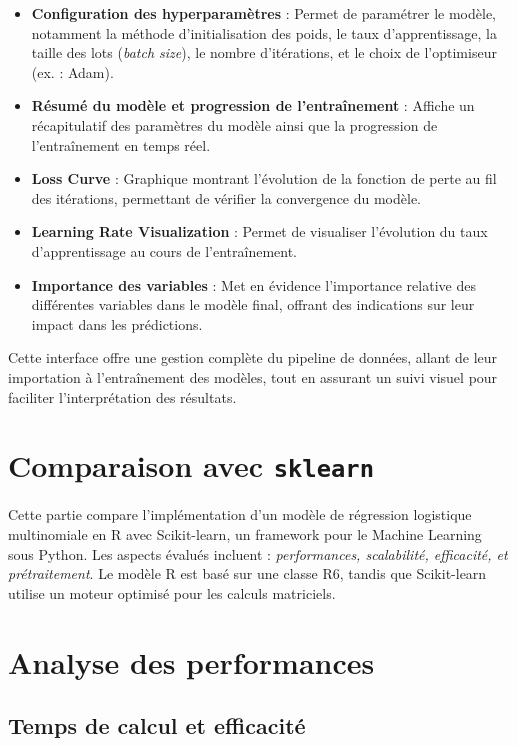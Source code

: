 \documentclass[a4paper,12pt]{article}
\begin{document}
\begin{itemize}
    \item \textbf{Configuration des hyperparamètres} : Permet de paramétrer le modèle, notamment la méthode d'initialisation des poids, le taux d'apprentissage, la taille des lots (\textit{batch size}), le nombre d'itérations, et le choix de l'optimiseur (ex. : Adam).
    \item \textbf{Résumé du modèle et progression de l'entraînement} : Affiche un récapitulatif des paramètres du modèle ainsi que la progression de l'entraînement en temps réel.
    \item \textbf{Loss Curve} : Graphique montrant l'évolution de la fonction de perte au fil des itérations, permettant de vérifier la convergence du modèle.
    \item \textbf{Learning Rate Visualization} : Permet de visualiser l'évolution du taux d'apprentissage au cours de l'entraînement.
    \item \textbf{Importance des variables} : Met en évidence l'importance relative des différentes variables dans le modèle final, offrant des indications sur leur impact dans les prédictions.
\end{itemize}

\noindent Cette interface offre une gestion complète du pipeline de données, allant de leur importation à l'entraînement des modèles, tout en assurant un suivi visuel pour faciliter l'interprétation des résultats.

\section{Comparaison avec \texttt{sklearn}}


Cette partie compare l'implémentation d'un modèle de régression logistique multinomiale en R avec Scikit-learn, un framework pour le Machine Learning sous Python. Les aspects évalués incluent : \textit{performances, scalabilité, efficacité, et prétraitement}. Le modèle R est basé sur une classe R6, tandis que Scikit-learn utilise un moteur optimisé pour les calculs matriciels.

\section*{Analyse des performances}

\subsection*{Temps de calcul et efficacité}
\end{document}

